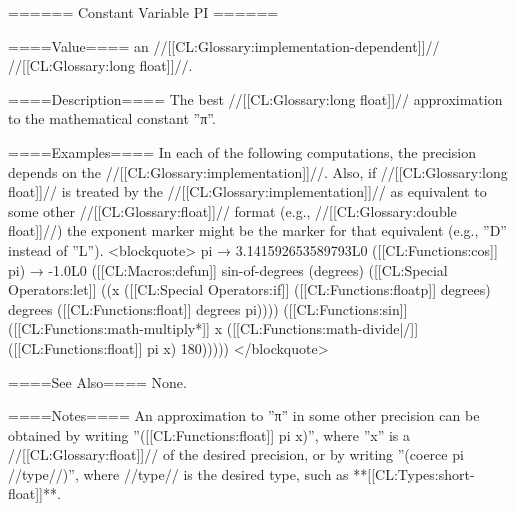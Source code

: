 ====== Constant Variable PI ======

====Value====
an //[[CL:Glossary:implementation-dependent]]// //[[CL:Glossary:long float]]//.

====Description====
The best //[[CL:Glossary:long float]]// approximation to the mathematical constant ''π''.

====Examples====
In each of the following computations, the precision depends on the //[[CL:Glossary:implementation]]//. Also, if //[[CL:Glossary:long float]]// is treated by the //[[CL:Glossary:implementation]]// as equivalent to some other //[[CL:Glossary:float]]// format (e.g., //[[CL:Glossary:double float]]//) the exponent marker might be the marker for that equivalent (e.g., ''D'' instead of ''L''). 
<blockquote> 
pi → 3.141592653589793L0 
([[CL:Functions:cos]] pi) → -1.0L0
([[CL:Macros:defun]] sin-of-degrees (degrees) 
  ([[CL:Special Operators:let]] ((x ([[CL:Special Operators:if]] ([[CL:Functions:floatp]] degrees) 
               degrees 
               ([[CL:Functions:float]] degrees pi)))) 
    ([[CL:Functions:sin]] ([[CL:Functions:math-multiply*]] x ([[CL:Functions:math-divide|/]] ([[CL:Functions:float]] pi x) 180)))))
</blockquote>

====See Also====
None.

====Notes====
An approximation to ''π'' in some other precision can be obtained by writing ''([[CL:Functions:float]] pi x)'', where ''x'' is a //[[CL:Glossary:float]]// of the desired precision, or by writing ''(coerce pi //type//)'', where //type// is the desired type, such as **[[CL:Types:short-float]]**.

